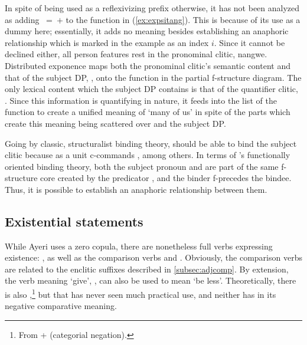 In spite of  being used as a reflexivizing prefix
otherwise, it has not been analyzed as adding \ups{\Refl{}}~=~$+$ to the
\Subj{} function in (\ref{ex:expsitang}). This is because of its use as a dummy
here; essentially, it adds no meaning besides establishing an anaphoric
relationship which is marked in the example as an index $i$. Since it cannot be
declined either, all person features rest in the pronominal clitic, 
{nang}{we}. Distributed exponence maps both the pronominal clitic's semantic
content and that of the subject DP, , onto the
\Subj{} function in the partial f-structure diagram. The only lexical content
which the subject DP contains is that of the quantifier clitic,
. Since this information is quantifying in nature, it
feeds into the \Quant{} list of the \Subj{} function to create a unified
meaning of `many of us' in spite of the parts which create this meaning being
scattered over  and the subject DP.

Going by classic, structuralist binding theory,  should be
able to bind the subject clitic because  as a unit
c-commands , among others. In terms of \Lfg{}'s
functionally oriented binding theory, both the subject pronoun and
 are part of the same f-structure core created by
the predicator , and the binder f-precedes the
bindee. Thus, it is possible to establish an anaphoric relationship between
them.

\subsection{Existential statements}
\label{subsec:exs}

While Ayeri uses a zero copula, there are nonetheless full verbs expressing
existence: , as well as the
comparison verbs   and
. Obviously, the comparison verbs are related to the
enclitic suffixes described in \autoref{subsec:adjcomp}. By extension, the verb
meaning `give', , can also be used to mean `be less'.
Theoretically, there is also ,\footnote{From
 +  (categorial negation).} but that
has never seen much practical use, and neither has  in its
negative comparative meaning.

